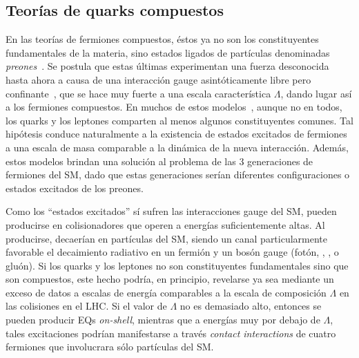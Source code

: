 \subsection{Teor\'ias de quarks compuestos}
\label{subsec:theory:bsm:qstar}

En las teorías de fermiones compuestos, éstos ya no son los constituyentes fundamentales de la materia, sino estados ligados de partículas denominadas \textit{preones}~\cite{Pfeil-1981}. Se postula que estas últimas experimentan una fuerza desconocida hasta ahora a causa de una interacción gauge asintóticamente libre pero confinante~\cite{Hooft-1980}, que se hace muy fuerte a una escala característica \(\Lambda\), dando lugar así a los fermiones compuestos. En muchos de estos modelos~\cite{Pati_Salam_Strathdee-1975,Fritzsch_Mandelbaum-1981,Baur_Fritzsch-1984}, aunque no en todos, los quarks y los leptones comparten al menos algunos constituyentes comunes. Tal hipótesis conduce naturalmente a la existencia de estados excitados de fermiones a una escala de masa comparable a la dinámica de la nueva interacci\'on. Adem\'as, estos modelos brindan una soluci\'on al problema de las 3 generaciones de fermiones del \ac{SM}, dado que estas generaciones ser\'ian diferentes configuraciones o estados excitados de los preones.

Como los \enquote{estados excitados} sí sufren las interacciones gauge del \ac{SM}, pueden producirse en colisionadores que operen a energías suficientemente altas. Al producirse, decaerían en partículas del \ac{SM}, siendo un canal particularmente favorable el decaimiento radiativo en un fermión y un bosón gauge (fotón, \Wboson, \Zboson, o gluón). Si los quarks y los leptones no son constituyentes fundamentales sino que son compuestos, este hecho podría, en principio, revelarse ya sea mediante un exceso de datos a escalas de energía comparables a la escala de composición \(\Lambda\) en las colisiones \pp en el \ac{LHC}. Si el valor de \(\Lambda\) no es demasiado alto, entonces se pueden producir \acp{EQ} \textit{on-shell}, mientras que a energías muy por debajo de \(\Lambda\), tales excitaciones podrían manifestarse a través \textit{contact interactions} de cuatro fermiones que involucrara sólo partículas del \ac{SM}.

